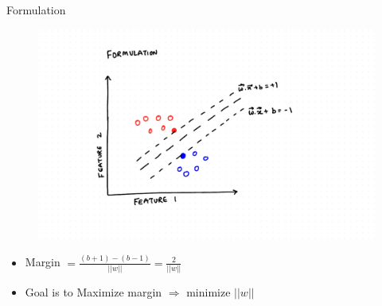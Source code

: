 \documentclass{beamer}
\begin{document}
\begin{frame}{Formulation}

\begin{figure}
\includegraphics[scale=0.4]{SVM/Svm-20.pdf}
\end{figure}

\begin{itemize}
\item Margin $ = \frac{(b+1)-(b-1)}{||w||} = \frac{2}{||w||}$\
\item Goal is to Maximize margin $\Rightarrow$ minimize $||w||$

\end{itemize}

\end{frame}
\end{document}
